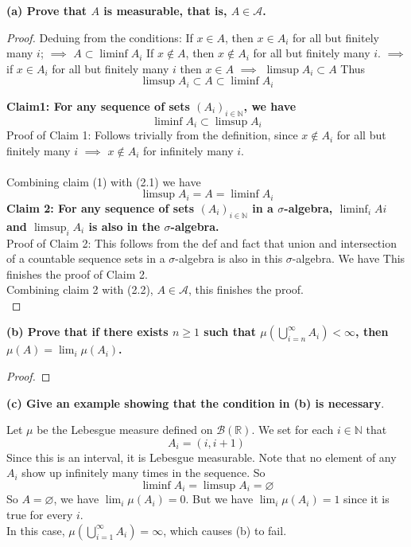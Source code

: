 \documentclass[lang=cn,11pt]{elegantbook}
\begin{document}
\noindent \textbf{(a) Prove that \(A\) is measurable, that is, \(A \in \mathcal{A}\).}
\begin{proof}
    Deduing from the conditions:
    If \(x \in A\), then \(x \in A_i\) for all but finitely many \(i\); $\implies $ $A \subset \liminf A_i$
    If \(x \notin A\), then \(x \notin A_i\) for all but finitely many \(i\). $\implies $ if \(x \in A_i\) for all but finitely many \(i\) then $x\in A$ $\implies$  $\limsup A_i \subset A$
    Thus 
    \begin{equation}
    \limsup A_i \subset A \subset \liminf A_i    
    \end{equation}
    
\noindent   \textbf{Claim1: For any sequence of sets $(A_i)_{i \in \mathbb{N}}$, we have 
$$\liminf A_i \subset \limsup A_i$$} 
Proof of Claim 1: Follows trivially from the definition, since \(x \notin A_i\) for all but finitely many \(i\) $\implies$ \(x \notin A_i\) for infinitely many \(i\).\\\\
Combining claim (1) with (2.1) we have
\begin{equation}
\limsup A_i  =  A  = \liminf A_i    
\end{equation}
\noindent \textbf{Claim 2: For any sequence of sets $(A_i)_{i\in \mathbb{N}}$ in a $\sigma$-algebra, $\liminf_i Ai$ and $\limsup_i A_i$ is also in the $\sigma$-algebra.}\\
Proof of Claim 2: This follows from the def and fact that union and intersection of a countable sequence sets in a $\sigma$-algebra is also in this $\sigma$-algebra. We have
This finishes the proof of Claim 2.\\
\noindent Combining claim 2 with (2.2), $A \in \mathcal{A}$, this finishes the proof.\\
\end{proof}

\noindent \textbf{(b)  Prove that if there exists \(n \geq 1\) such that \(\mu\left(\bigcup_{i=n}^\infty A_i\right) < \infty\), then \(\mu(A) = \lim_i \mu(A_i)\).}
\begin{proof}
    
\end{proof}


\noindent \textbf{(c) Give an example showing that the condition in (b) is necessary}.
\begin{solution}
\noindent  Let $\mu$ be the Lebesgue measure defined on $\mathcal{B}(\mathbb{R})$. We set for each $i\in \mathbb{N}$ that
\[
   A_i =(i,i+1)
\]
\noindent Since this is an interval, it is Lebesgue measurable. Note that no element of any $A_i$ show up infinitely many times in the sequence. So 
$$
\liminf A_i = \limsup A_i = \varnothing
$$
\noindent So $A = \varnothing$, we have $\lim_i \mu(A_i) = 0$.
\noindent But we have $\lim_i \mu(A_i)  = 1$ since it is true for every $i$.\\
\noindent In this case, $\mu(\bigcup_{i=1}^\infty A_i) = \infty$, which causes (b) to fail.
\end{solution}
\end{document}
